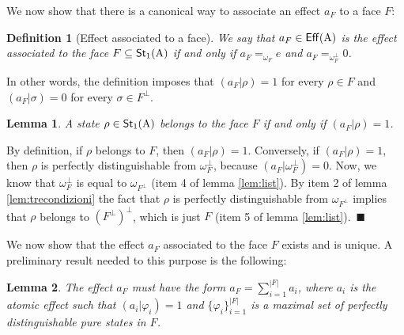 \documentclass[12pt,aps,pra,showpacs,groupedaddress]{revtex4-1}
\newtheorem{lemma}{Lemma} \newtheorem{proposition}{Proposition}
\newtheorem{definition}{Definition}
\def\Proof{\medskip\par\noindent{\bf Proof. }}
\def\qed{$\,\blacksquare$\par}
\def\Cntset{{\mathsf{Eff}}}
\def\Stset{{\mathsf{St}}}
\def\SC#1#2{\left(#1\right|\left.\!#2\right)}  \def\Tr{{\rm Tr}}
\begin{document}
We now show that there is a canonical way to associate an effect $a_F$ to a face $F$:


\begin{definition}[Effect associated to a face]
 We say that $a_F \in\Cntset(\rA)$ is the \emph{effect associated to the face}  $F \subseteq \Stset_1 (\rA)$ if and only if $a_F  =_{\omega_F}  e  $  and $a_F =_{\omega_F^\perp}  0$.
 \label{def:effface}
 \end{definition}
In other words, the definition imposes that $\SC {a_F} \rho = 1$ for every $\rho \in F$  and $\SC {a_F} \sigma = 0 $ for every $\sigma \in F^\perp$.

\begin{lemma}
  A state $\rho\in\Stset_1(\rA)$ belongs to the face $F$ if and only
  if $(a_F|\rho)=1$.
  \label{lem:identifytest}
\end{lemma}

\Proof By definition, if $\rho$ belongs to $F$, then $(a_F|\rho)=1$. Conversely, if
$(a_F|\rho)=1$, then $\rho$ is perfectly distinguishable from $\omega^\perp_{F}$, because $\SC {a_F}{\omega_F^\perp} =0$.  Now, we know that $\omega_F^\perp$ is equal to $\omega_{F^\perp}$ (item 4 of lemma
\ref{lem:list}). By item 2 of lemma \ref{lem:trecondizioni} the fact that $\rho$ is perfectly
distinguishable from $\omega_{F^\perp}$ implies that $\rho$ belongs to $\left( F^\perp
\right)^\perp$, which is just $F$ (item 5 of lemma \ref{lem:list}). \qed

We now show that the effect $a_F$ associated to the face $F$ exists and is unique.
A preliminary result needed to this purpose is the following:  

\begin{lemma}\label{lem:concreteaF}
  The effect $a_F$ must have the form $a_F = \sum_{i=1}^{|F|} a_i$, where
  $a_i$ is the atomic effect such that $\SC {a_i}{\varphi_i} =1$ and
  $\{\varphi_i\}_{i=1}^{|F|}$ is a maximal set of perfectly
  distinguishable pure states in $F$.
\end{lemma}
\end{document}
